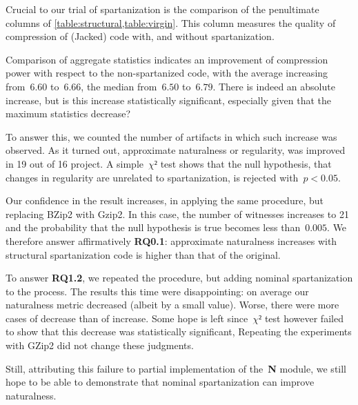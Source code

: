 Crucial to our trial of spartanization is the comparison of the penultimate
columns of \cref{table:structural,table:virgin}.
This column measures the quality of compression of (Jacked) code
with, and without spartanization.

Comparison of aggregate statistics indicates an improvement of compression
power with respect to the non-spartanized code, with the average increasing
from~$6.60$ to~$6.66$, the median from~$6.50$ to~$6.79$. There is indeed an
absolute increase, but is this increase statistically significant, especially
given that the maximum statistics decrease?

To answer this, we counted the number of artifacts in which such increase was
observed. As it turned out, approximate naturalness or regularity, was improved
in 19 out of 16 project. A simple~$χ²$ test shows that the null hypothesis,
that changes in regularity are unrelated to spartanization, is rejected
with~$p < 0.05$.

Our confidence in the result increases, in applying the same procedure, but
replacing BZip2 with Gzip2. In this case, the number of witnesses increases
to 21 and the probability that the null hypothesis is true becomes
less than~$0.005$. We therefore answer affirmatively \textbf{RQ0.1}:
approximate naturalness increases with structural spartanization code is higher
than that of the original.

To answer \textbf{RQ1.2}, we repeated the procedure, but adding nominal
spartanization to the process. The results this time were disappointing:
on average our naturalness metric decreased (albeit by a small value).
Worse, there were more cases of decrease than of increase. Some hope is left
since~$χ²$ test however failed to show that this decrease was statistically
significant, Repeating the experiments with GZip2 did not change these
judgments.

Still, attributing this failure to partial implementation of the~\textbf{N}
module, we still hope to be able to demonstrate that nominal spartanization can
improve naturalness.
\endinput

The first column of \cref{table:comparisons-original} refers to the application
of the Jack algorithm to the spartanized code. As we can see some of these
values are negative - particularly average, max value and range.  A negative
value for the average of the Jack compression powers implies that, on average,
spartanized code is less prone to be compressed by Jack the original code.
Negative values for max compression and range, that are of course related values, means
that there is a significant difference, for some projects, in the degree of compression
that Jack might achieved on spartanized code.

